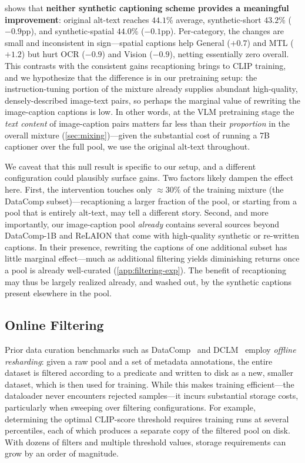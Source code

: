  shows that \textbf{neither synthetic captioning scheme provides a meaningful improvement}: original alt-text reaches $44.1$\% average, synthetic-short $43.2$\% ($-0.9$pp), and synthetic-spatial $44.0$\% ($-0.1$pp).
Per-category, the changes are small and inconsistent in sign---spatial captions help General ($+0.7$) and MTL ($+1.2$) but hurt OCR ($-0.9$) and Vision ($-0.9$), netting essentially zero overall.
This contrasts with the consistent gains recaptioning brings to CLIP training, and we hypothesize that the difference is in our pretraining setup: the instruction-tuning portion of the mixture already supplies abundant high-quality, densely-described image-text pairs, so perhaps the marginal value of rewriting the image-caption captions is low.
In other words, at the VLM pretraining stage the \emph{text content} of image-caption pairs matters far less than their \emph{proportion} in the overall mixture (\cref{sec:mixing})---given the substantial cost of running a 7B captioner over the full pool, we use the original alt-text throughout.

We caveat that this null result is specific to our setup, and a different configuration could plausibly surface gains.
Two factors likely dampen the effect here.
First, the intervention touches only $\approx\!30\%$ of the training mixture (the DataComp subset)---recaptioning a larger fraction of the pool, or starting from a pool that is entirely alt-text, may tell a different story.
Second, and more importantly, our image-caption pool \emph{already} contains several sources beyond DataComp-1B and ReLAION that come with high-quality synthetic or re-written captions.
In their presence, rewriting the captions of one additional subset has little marginal effect---much as additional filtering yields diminishing returns once a pool is already well-curated (\cref{app:filtering-exp}).
The benefit of recaptioning may thus be largely realized already, and washed out, by the synthetic captions present elsewhere in the pool.


\subsection{Online Filtering}\label{appsub:online_filtering}

Prior data curation benchmarks such as DataComp~\citep{gadre2023datacomp} and DCLM~\citep{li2024datacomp} employ \emph{offline resharding}: given a raw pool and a set of metadata annotations, the entire dataset is filtered according to a predicate and written to disk as a new, smaller dataset, which is then used for training.
While this makes training efficient---the dataloader never encounters rejected samples---it incurs substantial storage costs, particularly when sweeping over filtering configurations.
For example, determining the optimal CLIP-score threshold requires training runs at several percentiles, each of which produces a separate copy of the filtered pool on disk.
With dozens of filters and multiple threshold values, storage requirements can grow by an order of magnitude.

